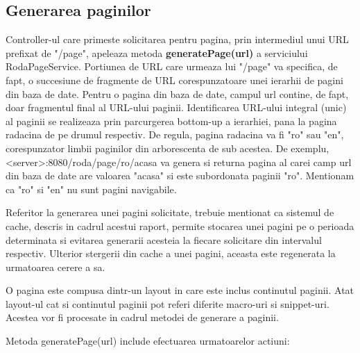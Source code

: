 \subsection{Generarea paginilor}

Controller-ul care primeste solicitarea pentru pagina, prin intermediul unui URL prefixat de "/page", apeleaza metoda \textbf{generatePage(url)} a serviciului RodaPageService. Portiunea de URL care urmeaza lui "/page" va specifica, de fapt, o succesiune de fragmente de URL corespunzatoare unei ierarhii de pagini din baza de date. Pentru o pagina din baza de date, campul url contine, de fapt, doar fragmentul final al URL-ului paginii. Identificarea URL-ului integral (unic) al paginii se realizeaza prin parcurgerea bottom-up a ierarhiei, pana la pagina radacina de pe drumul respectiv. De regula, pagina radacina va fi "ro" sau "en", corespunzator limbii paginilor din arborescenta de sub acestea. De exemplu, <server>:8080/roda/page/ro/acasa va genera si returna pagina al carei camp url din baza de date are valoarea "acasa" si este subordonata paginii "ro". Mentionam ca "ro" si "en" nu sunt pagini navigabile.

Referitor la generarea unei pagini solicitate, trebuie mentionat ca sistemul de cache, descris in cadrul acestui raport, permite stocarea unei pagini pe o perioada determinata si evitarea generarii acesteia la fiecare solicitare din intervalul respectiv. Ulterior stergerii din cache a unei pagini, aceasta este regenerata la urmatoarea cerere a sa.

O pagina este compusa dintr-un layout in care este inclus continutul paginii. Atat layout-ul cat si continutul paginii pot referi diferite macro-uri si snippet-uri. Acestea vor fi procesate in cadrul metodei de generare a paginii.

\bigskip

Metoda generatePage(url) include efectuarea urmatoarelor actiuni:

